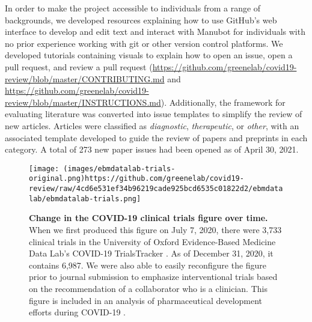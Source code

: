 \documentclass[twocolumn]{ceurart}
\begin{document}
In order to make the project accessible to individuals from a range of backgrounds, we developed resources explaining how to use GitHub's web interface to develop and edit text and interact with Manubot for individuals with no prior experience working with git or other version control platforms.
We developed tutorials containing visuals to explain how to open an issue, open a pull request, and review a pull request (\url{https://github.com/greenelab/covid19-review/blob/master/CONTRIBUTING.md} and \url{https://github.com/greenelab/covid19-review/blob/master/INSTRUCTIONS.md}).
Additionally, the framework for evaluating literature was converted into issue templates to simplify the review of new articles.
Articles were classified as \emph{diagnostic}, \emph{therapeutic}, or \emph{other}, with an associated template developed to guide the review of papers and preprints in each category.
A total of 273 new paper issues had been opened as of April 30, 2021.

\begin{figure}
\hypertarget{fig:ebm-trials}{%
\centering
\texttt{[image: (images/ebmdatalab-trials-original.png)https://github.com/greenelab/covid19-review/raw/4cd6e531ef34b96219cade925bcd6535c01822d2/ebmdatalab/ebmdatalab-trials.png]}
\caption{\textbf{Change in the COVID-19 clinical trials figure over time.}
When we first produced this figure on July 7, 2020, there were 3,733 clinical trials in the University of Oxford Evidence-Based Medicine Data Lab's COVID-19 TrialsTracker \citep{SSbnPnzT}.
As of December 31, 2020, it contains 6,987.
We were also able to easily reconfigure the figure prior to journal submission to emphasize interventional trials based on the recommendation of a collaborator who is a clinician.
This figure is included in an analysis of pharmaceutical development efforts during COVID-19 \citep{cifK9B8t}.}\label{fig:ebm-trials}
}
\end{figure}
\end{document}
